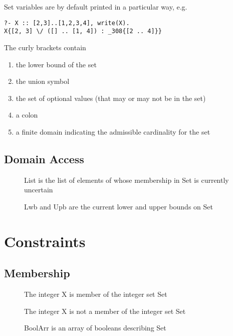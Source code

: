 Set variables are by default printed in a particular way, e.g.
\begin{verbatim}
?- X :: [2,3]..[1,2,3,4], write(X).
X{[2, 3] \/ ([] .. [1, 4]) : _308{[2 .. 4]}}
\end{verbatim}
The curly brackets contain
\begin{enumerate}
\item the lower bound of the set
\item the union symbol
\item the set of optional values (that may or may not be in the set)
\item a colon
\item a finite domain indicating the admissible cardinality for the set
\end{enumerate}



\subsection{Domain Access}

\begin{description}
\item[]
         List is the list of elements of whose membership in Set is currently uncertain 
\item[]
         Lwb and Upb are the current lower and upper bounds on Set 
\end{description}


\section{Constraints}

\subsection{Membership}

\begin{description}
\item[]
         The integer X is member of the integer set Set 
\item[]
         The integer X is not a member of the integer set Set 
\item[]
         BoolArr is an array of booleans describing Set 
\end{description}


